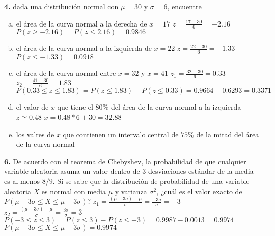 \documentclass[12pt, letterpaper]{article}
\begin{document}
    \textbf{4. } dada una distribución normal con $\mu = 30$ y $\sigma = 6$, encuentre
        \begin{enumerate}[a)]
            \item el área de la curva normal a la derecha de $x=17$\vskip0.5cm
                $z=\displaystyle\frac{17-30}{6}=-2.16$\vskip0.5cm
                $P(z\geq -2.16)=P(z\leq 2.16)=0.9846$
            \item el área de la curva normal a la izquierda de $x=22$\vskip0.5cm
                $z=\displaystyle\frac{22-30}{6}=-1.33$\vskip0.5cm
                $P(z\leq -1.33)=0.0918$
            \item el área de la curva normal entre $x=32$ y $x=41$\vskip0.5cm
                $z_1=\displaystyle\frac{32-30}{6}=0.33$\vskip0.5cm
                $z_2=\displaystyle\frac{41-30}{6}=1.83$\vskip0.5cm
                $P(0.33\leq z\leq 1.83)=P(z\leq 1.83)-P(z\leq 0.33)=0.9664-0.6293=0.3371$
            \item el valor de $x$ que tiene el $80\%$ del área de la curva normal a la izquierda\vskip0.5cm
                $z\simeq 0.48$\vskip0.5cm
                $x=0.48*6+30=32.88$
            \item los valres de $x$ que contienen un intervalo central de $75\%$ de la mitad del área de la curva normal

        \end{enumerate}\vskip1cm

    \textbf{6. }De acuerdo con el teorema de Chebyshev, la probabilidad de que cualquier variable aleatoria asuma un valor
    dentro de 3 desviaciones estándar de la media es al menos $8/9$. Si se sabe que la distribución de probabilidad de
    una variable aleatoria $X$ es normal con media $\mu$ y varianza $\sigma ^2$, ¿cuál es el valor exacto de
    $P(\mu - 3\sigma \leq X\leq \mu + 3\sigma )$?\vskip0.5cm
        $z_1=\displaystyle\frac{(\mu -3\sigma)-\mu}{\sigma}=\frac{-3\sigma}{\sigma}=-3$\vskip0.5cm
        $z_2=\displaystyle\frac{(\mu +3\sigma)-\mu}{\sigma}=\frac{3\sigma}{\sigma}=3$\vskip0.5cm
        $P(-3\leq z\leq 3)=P(z\leq 3)-P(z\leq -3)=0.9987-0.0013=0.9974$\vskip0.5cm
        $P(\mu - 3\sigma \leq X\leq \mu + 3\sigma )=0.9974$
    \vskip1cm
\end{document}
